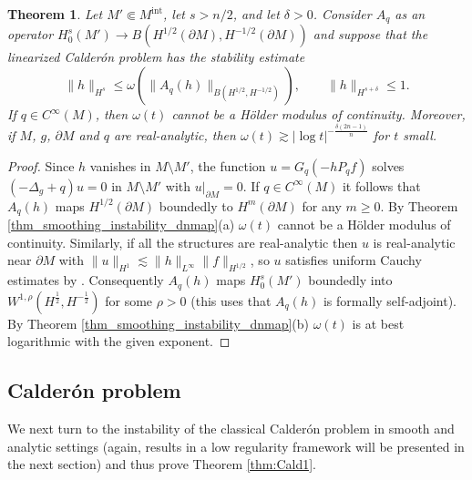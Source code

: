 \documentclass[12pt,twoside]{amsart}
\numberwithin{equation}{section}
\renewcommand{\leq}{\leqslant}
\renewcommand{\geq}{\geqslant}
\newtheorem{theorem}{Theorem}[section]
\newcommand {\p} {\partial}
\newcommand{\abs}[1]{\lvert #1 \rvert}          %
\newcommand{\norm}[1]{\lVert #1 \rVert}         %
\begin{document}
\begin{theorem}
Let $M' \Subset M^{\mathrm{int}}$, let $s > n/2$, and let $\delta > 0$. Consider $A_q$ as an operator $H^s_0(M') \to B(H^{1/2}(\p M), H^{-1/2}(\p M))$ and suppose that the linearized Calder\'on problem has the stability estimate 
\[
\norm{h}_{H^s} \leq \omega(\norm{A_q(h)}_{B(H^{1/2},H^{-1/2})}), \qquad \norm{h}_{H^{s+\delta}} \leq 1.
\]
If $q \in C^{\infty}(M)$, then $\omega(t)$ cannot be a H\"older modulus of continuity. Moreover, if $M$, $g$, $\p M$ and $q$ are real-analytic, then $\omega(t) \gtrsim \abs{\log t}^{- \frac{\delta(2n-1)}{n}}$ for $t$ small.
\end{theorem}
\begin{proof}
Since $h$ vanishes in $M \setminus M'$, the function $u = G_q(-h P_q f)$ solves $(-\Delta_g+q)u = 0$ in $M \setminus M'$ with $u|_{\p M} = 0$. If $q \in C^{\infty}(M)$ it follows that $A_q(h)$ maps $H^{1/2}(\p M)$ boundedly to $H^m(\p M)$ for any $m \geq 0$. By Theorem \ref{thm_smoothing_instability_dnmap}(a) $\omega(t)$ cannot be a H\"older modulus of continuity. Similarly, if all the structures are real-analytic then $u$ is real-analytic near $\p M$ with $\norm{u}_{H^1} \lesssim \norm{h}_{L^{\infty}} \norm{f}_{H^{1/2}}$, so $u$ satisfies uniform Cauchy estimates by \cite[Theorem 1.3 in Chapter 8 of vol. III]{LionsMagenes}. Consequently $A_q(h)$ maps $H^s_0(M')$ boundedly into $W^{1,\rho}(H^{\frac{1}{2}}, H^{- \frac{1}{2}})$ for some $\rho > 0$ (this uses that $A_q(h)$ is formally self-adjoint). By Theorem \ref{thm_smoothing_instability_dnmap}(b) $\omega(t)$ is at best logarithmic with the given exponent.
\end{proof}

\subsection{Calder\'on problem}

We next turn to the instability of the classical Calder\'on problem in smooth and analytic settings (again, results in a low regularity framework will be presented in the next section) and thus prove Theorem \ref{thm:Cald1}.
\end{document}
